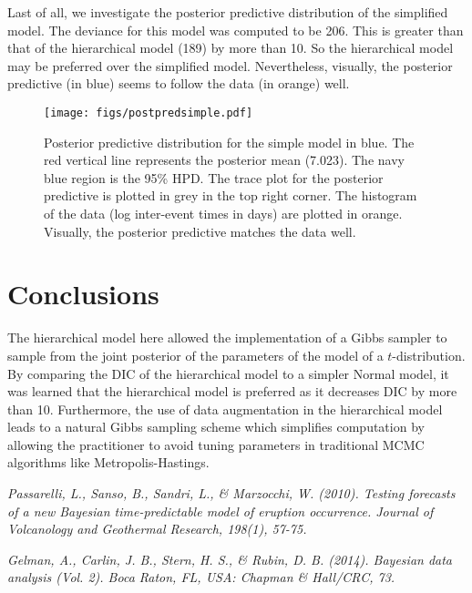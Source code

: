 \documentclass{../../tex_template/asaproc}
\begin{document}
Last of all, we investigate the posterior predictive distribution of the
simplified model. The deviance for this model was computed to be 206. This is
greater than that of the hierarchical model (189) by more than 10. So the
hierarchical model may be preferred over the simplified model. Nevertheless,
visually, the posterior predictive (in blue) seems to follow the data (in
orange) well.

\begin{figure}[H]
  \texttt{[image: figs/postpredsimple.pdf]}
  \caption{\small Posterior predictive distribution for the simple model in blue.
  The red vertical line represents the posterior mean (7.023). The navy blue
  region is the 95\% HPD. The trace plot for the posterior predictive is plotted
  in grey in the top right corner. The histogram of the data (log inter-event times 
  in days) are plotted in orange. Visually, the posterior predictive matches the 
  data well.}
  \label{fig:postpredsimple}
\end{figure}

\section{Conclusions}
The hierarchical model here allowed the implementation of a Gibbs sampler to
sample from the joint posterior of the parameters of the model of a
$t$-distribution. By comparing the DIC of the hierarchical model to a simpler
Normal model, it was learned that the hierarchical model is preferred as it
decreases DIC by more than 10. Furthermore, the use of data augmentation in the
hierarchical model leads to a natural Gibbs sampling scheme which simplifies
computation by allowing the practitioner to avoid tuning parameters in
traditional MCMC algorithms like Metropolis-Hastings.

\begin{references}
{\footnotesize
\itemsep=3pt
\item {\em Passarelli, L., Sanso, B., Sandri, L., \& Marzocchi, W. (2010). Testing forecasts of a new Bayesian time-predictable model of eruption occurrence. Journal of Volcanology and Geothermal Research, 198(1), 57-75.}
\item {\em Gelman, A., Carlin, J. B., Stern, H. S., \& Rubin, D. B. (2014). Bayesian data analysis (Vol. 2). Boca Raton, FL, USA: Chapman \& Hall/CRC, 73.}
}

\end{references}
\end{document}
